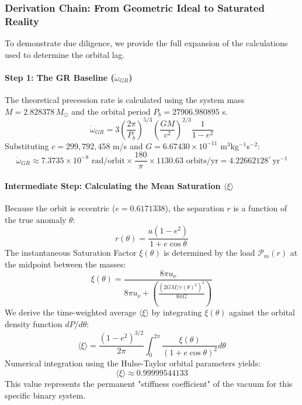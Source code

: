 \documentclass{article}
\begin{document}
\subsubsection{Derivation Chain: From Geometric Ideal to Saturated Reality}

To demonstrate due diligence, we provide the full expansion of the calculations used to determine the orbital lag.

\paragraph{Step 1: The GR Baseline ($\dot{\omega}_{GR}$)}
The theoretical precession rate is calculated using the system mass $M = 2.828378 \, M_{\odot}$ and the orbital period $P_b = 27906.980895$ s.
\begin{equation}
\dot{\omega}_{GR} = 3 \left( \frac{2\pi}{P_b} \right)^{5/3} \left( \frac{G M}{c^2} \right)^{2/3} \frac{1}{1-e^2}
\end{equation}
Substituting $c = 299,792,458$ m/s and $G = 6.67430 \times 10^{-11}$ m$^3$kg$^{-1}$s$^{-2}$:
\begin{equation}
\dot{\omega}_{GR} \approx 7.3735 \times 10^{-8} \text{ rad/orbit} \times \frac{180}{\pi} \times 1130.63 \text{ orbits/yr} = 4.22662128^\circ \, \text{yr}^{-1}
\end{equation}

\paragraph{Intermediate Step: Calculating the Mean Saturation $\langle \xi \rangle$}
Because the orbit is eccentric ($e = 0.6171338$), the separation $r$ is a function of the true anomaly $\theta$:
\begin{equation}
r(\theta) = \frac{a(1-e^2)}{1+e\cos\theta}
\end{equation}
The instantaneous Saturation Factor $\xi(\theta)$ is determined by the load $\mathcal{P}_m(r)$ at the midpoint between the masses:
\begin{equation}
\xi(\theta) = \frac{8\pi u_\nu}{8\pi u_\nu + \left( \frac{(2GM/r(\theta)^2)^2}{8\pi G} \right)}
\end{equation}
We derive the time-weighted average $\langle \xi \rangle$ by integrating $\xi(\theta)$ against the orbital density function $dP/d\theta$:
\begin{equation}
\langle \xi \rangle = \frac{(1-e^2)^{3/2}}{2\pi} \int_{0}^{2\pi} \frac{\xi(\theta)}{(1 + e \cos \theta)^2} d\theta
\end{equation}
Numerical integration using the Hulse-Taylor orbital parameters yields:
\begin{equation}
\langle \xi \rangle \approx 0.99999544133
\end{equation}
This value represents the permanent "stiffness coefficient" of the vacuum for this specific binary system.
\end{document}
